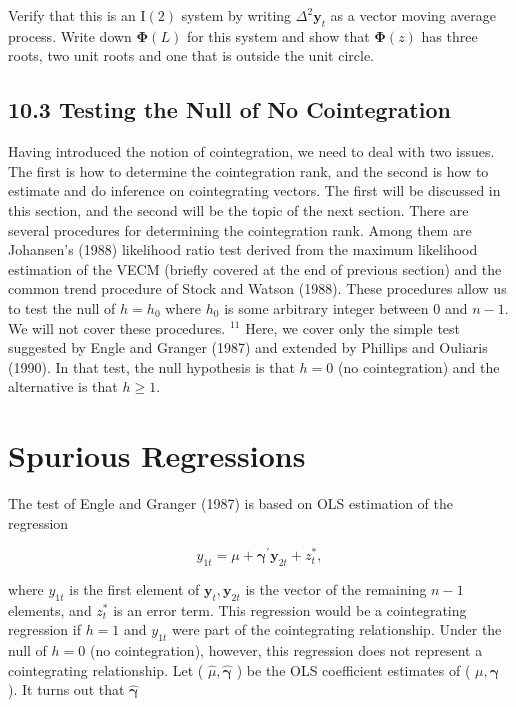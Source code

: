 \documentclass[10pt]{article}
\begin{document}
Verify that this is an $\mathrm{I}(2)$ system by writing $\Delta^{2} \mathbf{y}_{t}$ as a vector moving average process. Write down $\boldsymbol{\Phi}(L)$ for this system and show that $\boldsymbol{\Phi}(z)$ has three roots, two unit roots and one that is outside the unit circle.

\subsection*{10.3 Testing the Null of No Cointegration}
Having introduced the notion of cointegration, we need to deal with two issues. The first is how to determine the cointegration rank, and the second is how to estimate and do inference on cointegrating vectors. The first will be discussed in this section, and the second will be the topic of the next section. There are several procedures for determining the cointegration rank. Among them are Johansen's (1988) likelihood ratio test derived from the maximum likelihood estimation of the VECM (briefly covered at the end of previous section) and the common trend procedure of Stock and Watson (1988). These procedures allow us to test the null of $h=h_{0}$ where $h_{0}$ is some arbitrary integer between 0 and $n-1$. We will not cover these procedures. ${ }^{11}$ Here, we cover only the simple test suggested by Engle and Granger (1987) and extended by Phillips and Ouliaris (1990). In that test, the null hypothesis is that $h=0$ (no cointegration) and the alternative is that $h \geq 1$.

\section*{Spurious Regressions}
The test of Engle and Granger (1987) is based on OLS estimation of the regression


\begin{equation*}
y_{1 t}=\mu+\boldsymbol{\gamma}^{\prime} \mathbf{y}_{2 t}+z_{t}^{*}, \tag{10.3.1}
\end{equation*}


where $y_{1 t}$ is the first element of $\mathbf{y}_{t}, \mathbf{y}_{2 t}$ is the vector of the remaining $n-1$ elements, and $z_{t}^{*}$ is an error term. This regression would be a cointegrating regression if $h=1$ and $y_{1 t}$ were part of the cointegrating relationship. Under the null of $h=0$ (no cointegration), however, this regression does not represent a cointegrating relationship. Let ( $\hat{\mu}, \hat{\boldsymbol{\gamma}}$ ) be the OLS coefficient estimates of ( $\mu, \boldsymbol{\gamma}$ ). It turns out that $\hat{\boldsymbol{\gamma}}$
\end{document}
